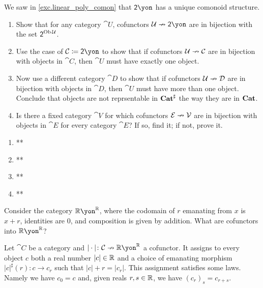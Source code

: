\documentclass[Book-Poly]{subfiles}
\begin{document}
\begin{exercise}\label{exc.rep_objects}
We saw in \cref{exc.linear_poly_comon} that $\2\yon$ has a unique comonoid structure.
\begin{enumerate}
	\item Show that for any category $\cat{U}$, cofunctors $\cat{U}\cof\2\yon$ are in bijection with the set $\textsf{2}^{\operatorname{Ob}\mathcal{U}}$.
	\item Use the case of $\cat{C}\coloneqq\2\yon$ to show that if cofunctors $\mathcal{U}\nrightarrow\mathcal{C}$ are in bijection with objects in $\cat{C}$, then $\cat{U}$ must have exactly one object.
	\item Now use a different category $\cat{D}$ to show that if cofunctors $\mathcal{U}\nrightarrow\mathcal{D}$ are in bijection with objects in $\cat{D}$, then $\cat{U}$ must have more than one object.
	Conclude that objects are not reprsentable in $\mathbf{Cat}^\sharp$ the way they are in $\mathbf{Cat}$.
	\item Is there a fixed category $\cat{V}$ for which cofunctors $\mathcal{E}\nrightarrow\mathcal{V}$ are in bijection with objects in $\cat{E}$ for every category $\cat{E}$?
	If so, find it; if not, prove it.
\qedhere
\end{enumerate}
\begin{solution}
\begin{enumerate}
    \item **
    \item **
    \item **
    \item **
\end{enumerate}
\end{solution}
\end{exercise}


\begin{example}\label{ex.cof_to_rr} %
Consider the category $\rr\yon^\rr$, where the codomain of $r$ emanating from $x$ is $x+r$, identities are $0$, and composition is given by addition. What are cofunctors into $\rr\yon^\rr$?

Let $\cat{C}$ be a category and $|\cdot|\colon\cat{C}\cof\rr\yon^\rr$ a cofunctor. It assigns to every object $c$ both a real number $|c|\in\mathbb{R}$ and a choice of emanating morphism $|c|^\sharp(r)\colon c\to c_r$ such that $|c|+r=|c_r|$. This assignment satisfies some laws. Namely we have $c_0=c$ and, given reals $r,s\in\mathbb{R}$, we have $(c_r)_s=c_{r+s}$. 
\end{example}

\end{document}
